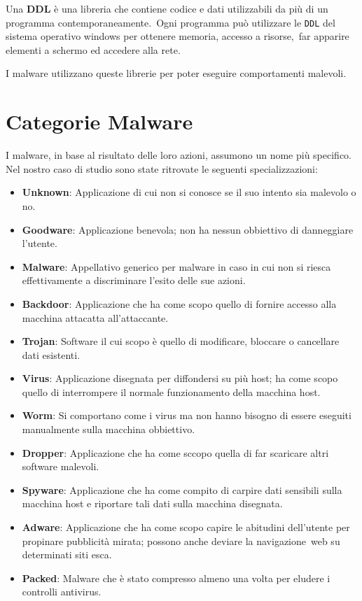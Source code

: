 Una \textbf{DDL} è una libreria che contiene codice e dati utilizzabili da più di un programma contemporaneamente.\
Ogni programma può utilizzare le \texttt{DDL} del sistema operativo windows per ottenere memoria, accesso a risorse,\
far apparire elementi a schermo ed accedere alla rete\cite{Microsoft-DLL}.

I malware utilizzano queste librerie per poter eseguire comportamenti malevoli.

\section{Categorie Malware}

I malware, in base al risultato delle loro azioni, assumono un nome più specifico. Nel nostro caso di studio sono state ritrovate le seguenti specializzazioni:
\begin{itemize}
      \item \textbf{Unknown}: Applicazione di cui non si conosce se il suo intento sia malevolo o no.
      \item \textbf{Goodware}: Applicazione benevola; non ha nessun obbiettivo di danneggiare l'utente.
      \item \textbf{Malware}: Appellativo generico per malware in caso in cui non si riesca effettivamente a discriminare l'esito delle sue azioni.
      \item \textbf{Backdoor}: Applicazione che ha come scopo quello di fornire accesso alla macchina attacatta all'attaccante\cite{Kaspersky-malware_backdoor}.
      \item \textbf{Trojan}: Software il cui scopo è quello di modificare, bloccare o cancellare dati esistenti\cite{Cisco-Malware_Taxonomy}.
      \item \textbf{Virus}: Applicazione disegnata per diffondersi su più host; ha come scopo quello di interrompere il normale funzionamento della macchina host\cite{Cisco-Malware_Taxonomy}.
      \item \textbf{Worm}: Si comportano come i virus ma non hanno bisogno di essere eseguiti manualmente sulla macchina obbiettivo\cite{Cisco-Malware_Taxonomy}.
      \item \textbf{Dropper}: Applicazione che ha come sccopo quella di far scaricare altri software malevoli\cite{Kaspersky-malware_dropper}.
      \item \textbf{Spyware}: Applicazione che ha come compito di carpire dati sensibili sulla macchina host e riportare tali dati sulla macchina disegnata\cite{Cisco-Malware_Taxonomy}.
      \item \textbf{Adware}: Applicazione che ha come scopo capire le abitudini dell'utente per propinare pubblicità mirata; possono anche deviare la navigazione\
            web su determinati siti esca\cite{Cisco-Malware_Taxonomy}.
      \item \textbf{Packed}: Malware che è stato compresso almeno una volta per eludere i controlli antivirus\cite{Kaspersky-malware_MultiPacked}.
\end{itemize}

